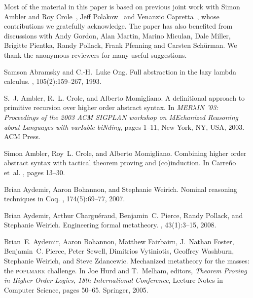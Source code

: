 \documentclass[final]{svjour3}
\begin{document}
\begin{acknowledgements}
  Most of the material in this paper is based on previous joint work
  with Simon Ambler and Roy
  Crole~\cite{MomTP01,Ambler02,Momigliano02lfm,ACM03prim,Momigliano03fos},
  Jeff Polakow~\cite{MomiglianoP03} and Venanzio
  Capretta~\cite{CapFel07}, whose contributions we gratefully
  acknowledge.  The paper has also benefited from discussions with
  Andy Gordon, Alan Martin, Marino Miculan, Dale Miller, Brigitte
  Pientka, Randy Pollack, Frank Pfenning and Carsten Sch\"{u}rman. We
  thank the anonymous reviewers for many useful suggestions.
\end{acknowledgements}







\begin{thebibliography}{100}

Samson Abramsky and C.-H.~Luke Ong.
\newblock Full abstraction in the lazy lambda calculus.
, 105(2):159--267, 1993.

S.~J. Ambler, R.~L. Crole, and Alberto Momigliano.
\newblock A definitional approach to primitive recursion over higher order
  abstract syntax.
\newblock In {\em {MER$\lambda$IN '03: Proceedings of the 2003 ACM SIGPLAN
  workshop on MEchanized Reasoning about Languages with varIable biNding}},
  pages 1--11, New York, NY, USA, 2003. ACM Press.

Simon Ambler, Roy~L. Crole, and Alberto Momigliano.
\newblock Combining higher order abstract syntax with tactical theorem proving
  and (co)induction.
\newblock In Carre{\~n}o et~al. \cite{DBLP:conf/tphol/2002}, pages 13--30.

Brian Aydemir, Aaron Bohannon, and Stephanie Weirich.
\newblock Nominal reasoning techniques in {Coq}.
, 174(5):69--77, 2007.

Brian Aydemir, Arthur Chargu\'{e}raud, Benjamin~C. Pierce, Randy Pollack, and
  Stephanie Weirich.
\newblock Engineering formal metatheory.
, 43(1):3--15, 2008.

Brian~E. Aydemir, Aaron Bohannon, Matthew Fairbairn, J.~Nathan Foster,
  Benjamin~C. Pierce, Peter Sewell, Dimitrios Vytiniotis, Geoffrey Washburn,
  Stephanie Weirich, and Steve Zdancewic.
\newblock Mechanized metatheory for the masses: the {\textsc{poplmark}}
  challenge.
\newblock In Joe Hurd and T.~Melham, editors, {\em Theorem Proving in Higher
  Order Logics, 18th International Conference}, Lecture Notes in Computer
  Science, pages 50--65. Springer, 2005.


\end{thebibliography}
\end{document}
